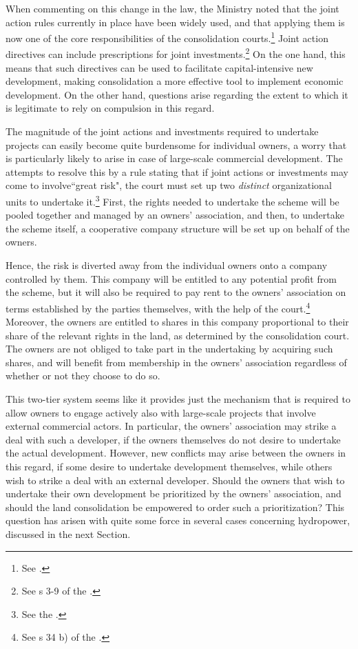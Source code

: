 When commenting on this change in the law, the Ministry noted that the joint action rules currently in place have been widely used, and that applying them is now one of the core responsibilities of the consolidation courts.\footnote{See \cite[146]{prop12}.} Joint action directives can include prescriptions for joint investments.\footnote{See s 3-9 of the \cite{lca13}.} On the one hand, this means that such directives can be used to facilitate capital-intensive new development, making consolidation a more effective tool to implement economic development. On the other hand, questions arise regarding the extent to which it is legitimate to rely on compulsion in this regard.

The magnitude of the joint actions and investments required to undertake projects can easily become quite burdensome for individual owners, a worry that is particularly likely to arise in case of large-scale commercial development. The \cite{lca79} attempts to resolve this by a rule stating that if joint actions or investments may come to involve``great risk", the court must set up two \emph{distinct} organizational units to undertake it.\footnote{See the \cite[34 b)|42]{lca79}.} First, the rights needed to undertake the scheme will be pooled together and managed by an owners' association, and then, to undertake the scheme itself, a cooperative company structure will be set up on behalf of the owners. 

Hence, the risk is diverted away from the individual owners onto a company controlled by them. This company will be entitled to any potential profit from the scheme, but it will also be required to pay rent to the owners' association on terms established by the parties themselves, with the help of the court.\footnote{See s 34 b) of the \cite{lca79}.} Moreover, the owners are entitled to shares in this company proportional to their share of the relevant rights in the land, as determined by the consolidation court. The owners are not obliged to take part in the undertaking by acquiring such shares, and will benefit from membership in the owners' association regardless of whether or not they  choose to do so. 

This two-tier system seems like it provides just the mechanism that is required to allow owners to engage actively also with large-scale projects that involve external commercial actors. In particular, the owners' association may strike a deal with such a developer, if the owners themselves do not desire to undertake the actual development. However, new conflicts may arise between the owners in this regard, if some desire to undertake development themselves, while others wish to strike a deal with an external developer. Should the owners that wish to undertake their own development be prioritized by the owners' association, and should the land consolidation be empowered to order such a prioritization? This question has arisen with quite some force in several cases concerning hydropower, discussed in the next Section.

